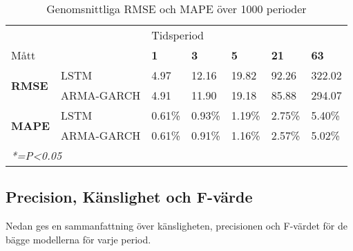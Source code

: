 \documentclass[11pt]{article}
\begin{document}
\begin{table}[H]
\caption{Genomsnittliga RMSE och MAPE över 1000 perioder}
\begin{tabular}{||lllllll||}
\hline
                                     &            & \multicolumn{5}{l||}{Tidsperiod}                                  \\
Mått                                 &            & \textbf{1} & \textbf{3} & \textbf{5} & \textbf{21} & \textbf{63} \\ \hline\hline
\multirow{2}{*}{\textbf{RMSE}}  & LSTM       & 4.97          & 12.16         & 19.82          & 92.26           & 322.02        \\
                                & ARMA-GARCH & 4.91          & 11.90         & 19.18          & 85.88            & 294.07           \\ \cline{2-7} 
\multirow{2}{*}{\textbf{MAPE}}  & LSTM       & 0.61\%        & 0.93\%       & 1.19\%        & 2.75\%          & 5.40\%        \\
                                & ARMA-GARCH & 0.61\%        & 0.91\%       & 1.16\%        & 2.57\%          & 5.02\%        
                                \\ \hline
\multicolumn{5}{l}{\textit{*=P\textless{}0.05}}
\end{tabular}
\end{table}

\subsection{Precision, Känslighet och F-värde}
Nedan ges en sammanfattning över känsligheten, precisionen och F-värdet för de bägge modellerna för varje period.
\end{document}
